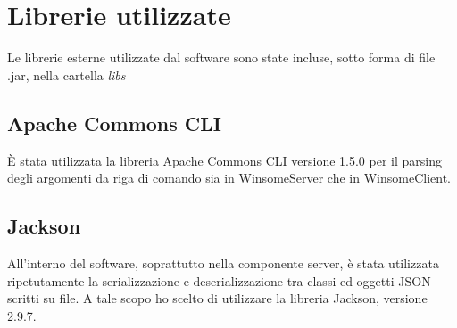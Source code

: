 \section{Librerie utilizzate}
Le librerie esterne utilizzate dal software sono state incluse, sotto forma di file .jar, nella
cartella \textit{libs}

\subsection{Apache Commons CLI}
È stata utilizzata la libreria Apache Commons CLI versione 1.5.0 per il parsing degli argomenti da riga di comando sia in WinsomeServer che in WinsomeClient.
\subsection{Jackson}
All'interno del software, soprattutto nella componente server, è stata utilizzata ripetutamente
la serializzazione e deserializzazione tra classi ed oggetti JSON scritti su file.
A tale scopo ho scelto di utilizzare la libreria Jackson, versione 2.9.7.